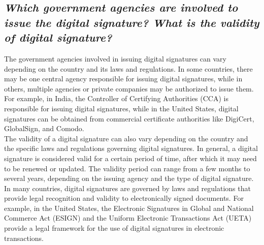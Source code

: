 \documentclass{article}
\begin{document}
\subsection{\textit{Which government agencies are involved to issue the digital signature? What is the validity of digital signature? }}
The government agencies involved in issuing digital signatures can vary depending on the country and its laws and regulations. In some countries, there may be one central agency responsible for issuing digital signatures, while in others, multiple agencies or private companies may be authorized to issue them.\\

For example, in India, the Controller of Certifying Authorities (CCA) is responsible for issuing digital signatures, while in the United States, digital signatures can be obtained from commercial certificate authorities like DigiCert, GlobalSign, and Comodo.\\

The validity of a digital signature can also vary depending on the country and the specific laws and regulations governing digital signatures. In general, a digital signature is considered valid for a certain period of time, after which it may need to be renewed or updated. The validity period can range from a few months to several years, depending on the issuing agency and the type of digital signature.\\

In many countries, digital signatures are governed by laws and regulations that provide legal recognition and validity to electronically signed documents. For example, in the United States, the Electronic Signatures in Global and National Commerce Act (ESIGN) and the Uniform Electronic Transactions Act (UETA) provide a legal framework for the use of digital signatures in electronic transactions.
\end{document}
